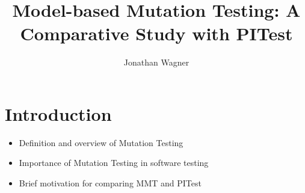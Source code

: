 \documentclass[sigplan, nonacm]{acmart}
\begin{document}
\title{Model-based Mutation Testing: A Comparative Study with PITest}

\author{Jonathan Wagner}

\maketitle

\section{Introduction}
\begin{itemize}
	\item Definition and overview of Mutation Testing
	\item Importance of Mutation Testing in software testing
	\item Brief motivation for comparing MMT and PITest
\end{itemize}
\end{document}

